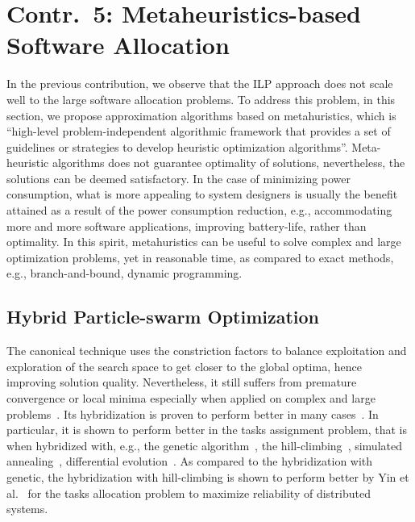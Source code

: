 \section{Contr.~5: Metaheuristics-based Software Allocation}\label{rc_pso}
In the previous contribution, we observe that the ILP approach does not scale well to the large software allocation problems. To address this problem, in this section, we propose approximation algorithms based on metahuristics, which is ``high-level problem-independent algorithmic framework that provides a set of guidelines or strategies to develop heuristic optimization algorithms''. Meta-heuristic algorithms does not guarantee optimality of solutions, nevertheless, the solutions can be deemed satisfactory. In the case of minimizing power consumption, what is more appealing to system designers is usually the benefit attained as a result of the power consumption reduction, e.g., accommodating more and more software applications, improving battery-life, rather than optimality. In this spirit, metahuristics can be useful to solve complex and large optimization problems, yet in reasonable time, as compared to exact methods, e.g., branch-and-bound, dynamic programming.

\subsection*{Hybrid Particle-swarm Optimization}
The canonical \pso{} technique uses the constriction factors to balance exploitation and exploration of the search space to get closer to the global optima, hence improving solution quality. Nevertheless, it still suffers from premature convergence or local minima especially when applied on complex and large problems~\cite{Rini2011ParticleChallenges}. Its hybridization is proven to perform better in many cases~\cite{Sengupta2018ParticlePerspectives}. In particular, it is shown to perform better in the tasks assignment problem, that is when hybridized with, e.g., the genetic algorithm~\cite{Sailer2013OptimizingAUTOSAR}, the hill-climbing~\cite{yin2007task}, simulated annealing~\cite{Zhao2007ASystem}, differential evolution~\cite{Storn1997DifferentialSpaces}. As compared to the hybridization with genetic, the hybridization with hill-climbing \hcpso{} is shown to perform better by Yin et al.~\cite{yin2007task} for the tasks allocation problem to maximize reliability of distributed systems. 

